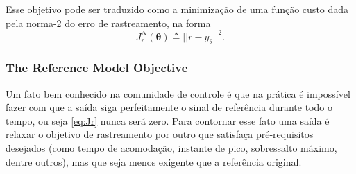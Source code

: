Esse objetivo pode ser traduzido como a minimização de uma função custo dada pela norma-2 do erro de rastreamento, na forma
\begin{equation}
   J_r^N(\bm{\theta}) \triangleq || r - y_\theta ||^2 .
   \label{eq:Jr}
\end{equation}

\subsubsection{The Reference Model Objective}%
\label{sub:The Reference Model Objective}

Um fato bem conhecido na comunidade de controle é que na prática é impossível fazer com que a saída siga perfeitamente o sinal de referência durante todo o tempo, ou seja \eqref{eq:Jr} nunca será zero.
Para contornar esse fato uma saída é relaxar o objetivo de rastreamento por outro que satisfaça pré-requisitos desejados (como tempo de acomodação, instante de pico, sobressalto máximo, dentre outros), mas que seja menos exigente que a referência original.

